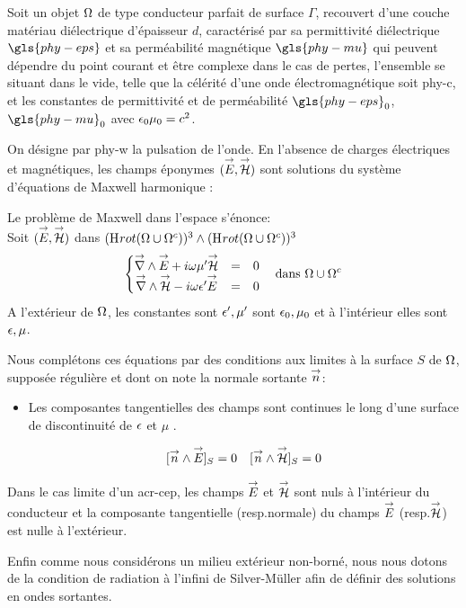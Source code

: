 Soit un objet $\Omega$ de type conducteur parfait de surface $\Gamma$, recouvert d'une couche matériau diélectrique d'épaisseur $d$, caractérisé par sa permittivité diélectrique $\gls{phy-eps}$ et sa perméabilité magnétique $\gls{phy-mu}$ qui peuvent dépendre du point courant et être complexe dans le cas de pertes, l'ensemble se situant dans le vide, telle que la célérité d'une onde électromagnétique soit \gls{phy-c}, et les constantes de permittivité et de perméabilité $\gls{phy-eps}_0$, $\gls{phy-mu}_0$ avec $\epsilon_0\mu_0 = c^{2}$.


On désigne par \gls{phy-w} la pulsation de l'onde.
En l'absence de charges électriques et magnétiques, les champs éponymes $( {\overset{\rightarrow}{E}}, {\overset{\rightarrow}{\mathcal{H}}} )$ sont solutions du système d'équations de Maxwell harmonique : 

Le problème de Maxwell dans l'espace s'énonce: \\

Soit $({\overset{\rightarrow}{E}},{\overset{\rightarrow}{\mathcal{H}}})$ dans $(\mathrm{H}_\mathrm{{}}{rot}(\Omega\cup\Omega^c))^3 \wedge (\mathrm{H}_\mathrm{{}}{rot}(\Omega\cup\Omega^c))^3$
\begin{equation}
\label{eq:pres_th:intro:maxwell}
\left\lbrace \begin{matrix}
{\overset{\rightarrow}{\nabla}}\wedge {\overset{\rightarrow}{E}} + i\omega\mu' {\overset{\rightarrow}{\mathcal{H}}} &=& 0 \\
{\overset{\rightarrow}{\nabla}}\wedge {\overset{\rightarrow}{\mathcal{H}}} - i\omega\epsilon' {\overset{\rightarrow}{E}} &=& 0 \\
\end{matrix} \right.
\quad \text{dans $\Omega\cup\Omega^c$}
\end{equation}
A l'extérieur de $\Omega$, les constantes sont $\epsilon',\mu'$ sont $\epsilon_0,\mu_0$ et à l'intérieur elles sont $\epsilon,\mu$.


Nous complétons ces équations par des conditions aux limites à la surface $S$ de $\Omega$, supposée régulière et dont on note la normale sortante ${\overset{\rightarrow}{n}}$:
\begin{itemize}
  \item Les composantes tangentielles des champs sont continues le long d'une surface de discontinuité de $\epsilon$ et $\mu$ \cite[(2.10) p.~8]{senior_approximate_1995}.

  \begin{align}
  \label{eq:pres_th:intro:transmissions}[{\overset{\rightarrow}{n}} \wedge {\overset{\rightarrow}{E}}]_S = 0  \quad [{\overset{\rightarrow}{n}} \wedge {\overset{\rightarrow}{\mathcal{H}}}]_S = 0
  \end{align}
\end{itemize}
Dans le cas limite d'un \gls{acr-cep}, les champs ${\overset{\rightarrow}{E}}$ et ${\overset{\rightarrow}{\mathcal{H}}}$ sont nuls à l'intérieur du conducteur et la composante tangentielle (resp.normale) du champs ${\overset{\rightarrow}{E}}$ (resp.${\overset{\rightarrow}{\mathcal{H}}}$) est nulle à l'extérieur.


Enfin comme nous considérons un milieu extérieur non-borné, nous nous dotons de la condition de radiation à l'infini de Silver-Müller afin de définir des solutions en ondes sortantes.


